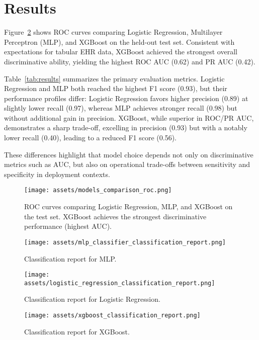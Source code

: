\documentclass{article}
\begin{document}
\section{Results}
Figure~\ref{fig:roc} shows ROC curves comparing Logistic Regression, Multilayer Perceptron (MLP), and XGBoost on the held-out test set. Consistent with expectations for tabular EHR data, XGBoost achieved the strongest overall discriminative ability, yielding the highest ROC AUC (0.62) and PR AUC (0.42). 

Table~\ref{tab:results} summarizes the primary evaluation metrics. Logistic Regression and MLP both reached the highest F1 score (0.93), but their performance profiles differ: Logistic Regression favors higher precision (0.89) at slightly lower recall (0.97), whereas MLP achieves stronger recall (0.98) but without additional gain in precision. XGBoost, while superior in ROC/PR AUC, demonstrates a sharp trade-off, excelling in precision (0.93) but with a notably lower recall (0.40), leading to a reduced F1 score (0.56). 

These differences highlight that model choice depends not only on discriminative metrics such as AUC, but also on operational trade-offs between sensitivity and specificity in deployment contexts. 

\begin{figure}[ht]
\centering
\texttt{[image: assets/models\_comparison\_roc.png]}
\caption{ROC curves comparing Logistic Regression, MLP, and XGBoost on the test set. XGBoost achieves the strongest discriminative performance (highest AUC).}
\label{fig:roc}
\end{figure}


\begin{figure}[ht]
\centering
\begin{minipage}{0.48\textwidth}
    \centering
    \texttt{[image: assets/mlp\_classifier\_classification\_report.png]}
    \caption{Classification report for MLP.}
    \label{fig:roc}
\end{minipage}\hfill
\begin{minipage}{0.48\textwidth}
    \centering
    \texttt{[image: assets/logistic\_regression\_classification\_report.png]}
    \caption{Classification report for Logistic Regression.}
    \label{fig:pr}
\end{minipage}
\begin{minipage}{0.48\textwidth}
    \centering
    \texttt{[image: assets/xgboost\_classification\_report.png]}
    \caption{Classification report for XGBoost.}
    \label{fig:roc}
\end{minipage}\hfill
\end{figure}
\end{document}

